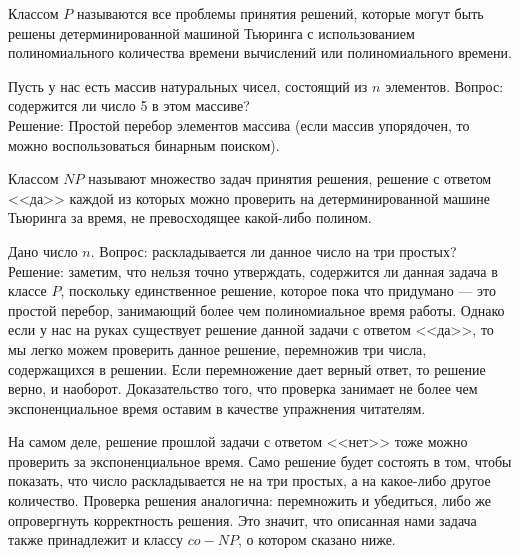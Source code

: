     
    
    \begin{Def} 
        Классом $P$ называются все проблемы принятия решений, которые могут быть решены детерминированной машиной Тьюринга с использованием полиномиального количества времени вычислений или полиномиального времени.
    \end{Def}
    \begin{Example}
        Пусть у нас есть массив натуральных чисел, состоящий из $n$ элементов. Вопрос: содержится ли число 5 в этом массиве?\\
        Решение: Простой перебор элементов массива (если массив упорядочен, то можно воспользоваться бинарным поиском).
    \end{Example}
    \begin{Def}
        Классом $NP$ называют множество задач принятия решения, решение с ответом <<да>> каждой из которых можно проверить на детерминированной машине Тьюринга за время, не превосходящее какой-либо полином.
    \end{Def}
    \begin{Example} 
        Дано число $n$. Вопрос: раскладывается ли данное число на три простых?\\
        Решение: заметим, что нельзя точно утверждать, содержится ли данная задача в классе $P$, поскольку единственное решение, которое пока что придумано --- это простой перебор, занимающий более чем полиномиальное время работы. Однако если у нас на руках существует решение данной задачи с ответом <<да>>, то мы легко можем проверить данное решение, перемножив три числа, содержащихся в решении. Если перемножение дает верный ответ, то решение верно, и наоборот. Доказательство того, что проверка занимает не более чем экспоненциальное время оставим в качестве упражнения читателям.
    \end{Example}
    \begin{Rem}
        На самом деле, решение прошлой задачи с ответом <<нет>> тоже можно проверить за экспоненциальное время. Само решение будет состоять в том, чтобы показать, что число раскладывается не на три простых, а на какое-либо другое количество. Проверка решения аналогична: перемножить и убедиться, либо же опровергнуть корректность решения. Это значит, что описанная нами задача также принадлежит и классу $co-NP$, о котором сказано ниже.
    \end{Rem}
